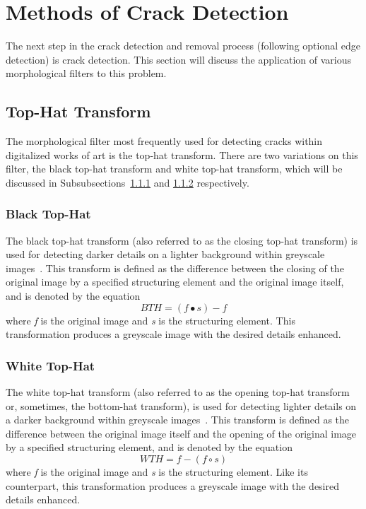 \documentclass{sig-alternate}
\begin{document}
\section{Methods of Crack Detection}\label{crack detection}
The next step in the crack detection and removal process (following optional edge detection) is crack detection. This section will discuss the application of various morphological filters to this problem.

\subsection{Top-Hat Transform}
The morphological filter most frequently used for detecting cracks within digitalized works of art is the top-hat transform. There are two variations on this filter, the black top-hat transform and white top-hat transform, which will be discussed in Subsubsections~\ref{black top-hat} and \ref{white top-hat} respectively.

\subsubsection{Black Top-Hat}\label{black top-hat}
The black top-hat transform (also referred to as the closing top-hat transform) is used for detecting darker details on a lighter background within greyscale images~\cite{Altarpiece:2013, TopHat:2010}. This transform is defined as the difference between the closing of the original image by a specified structuring element and the original image itself, and is denoted by the equation
\begin{equation*}
BTH = (f \bullet s) - f
\end{equation*}
where \textit{f} is the original image and \textit{s} is the structuring element. This transformation produces a greyscale image with the desired details enhanced.

\subsubsection{White Top-Hat}\label{white top-hat}
The white top-hat transform (also referred to as the opening top-hat transform or, sometimes, the bottom-hat transform), is used for detecting lighter details on a darker background within greyscale images~\cite{Altarpiece:2013, TopHat:2010}. This transform is defined as the difference between the original image itself and the opening of the original image by a specified structuring element, and is denoted by the equation
\begin{equation*}
WTH = f - (f \circ s)
\end{equation*}
where \textit{f} is the original image and \textit{s} is the structuring element. Like its counterpart, this transformation produces a greyscale image with the desired details enhanced.
\end{document}
